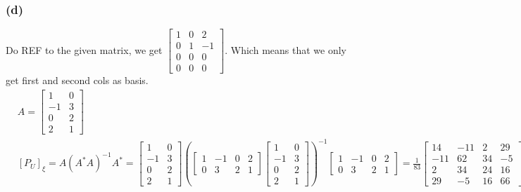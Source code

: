 \documentclass{article}
\begin{document}
\subsubsection*{(d)}
Do REF to the given matrix, we get $\begin{bmatrix}
    1 & 0 & 2 \\
    0 & 1 & -1 \\
    0 & 0 & 0 \\
    0 & 0 & 0 
\end{bmatrix}$. Which means that we only get first and second cols as basis.
\begin{equation*}
    \begin{split}
        &A = \begin{bmatrix}
            1 & 0 \\
            -1 & 3 \\
            0 & 2 \\
            2 & 1
        \end{bmatrix}\\
        &[P_U]_\xi = A(A^*A)^{-1}A^* = \begin{bmatrix}
            1 & 0 \\
            -1 & 3 \\
            0 & 2 \\
            2 & 1
        \end{bmatrix} (\begin{bmatrix}
            1 & -1 & 0 & 2 \\
            0 & 3 & 2 & 1 
        \end{bmatrix} \begin{bmatrix}
            1 & 0 \\
            -1 & 3 \\
            0 & 2 \\
            2 & 1
        \end{bmatrix})^{-1} \begin{bmatrix}
            1 & -1 & 0 & 2 \\
            0 & 3 & 2 & 1  
        \end{bmatrix} = \frac{1}{83}\begin{bmatrix}
                14 & -11 & 2 & 29 \\
                -11 & 62 & 34 & -5 \\
                2 & 34 & 24 & 16 \\
                29 & -5 & 16 & 66
        \end{bmatrix} 
    \end{split}
\end{equation*}
\end{document}
